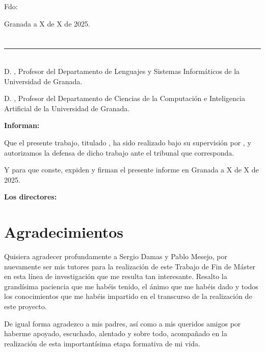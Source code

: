 \vspace{6cm}

\noindent Fdo: \myName

\vspace{2cm}

\begin{flushright}
Granada a X de X de 2025.
\end{flushright}


\chapter*{}
\thispagestyle{empty}

\noindent\rule[-1ex]{\textwidth}{2pt}\\[4.5ex]

D. \textbf{\myProf}, Profesor del Departamento de Lenguajes y Sistemas Informáticos de la Universidad de Granada.

\vspace{0.25cm}

D. \textbf{\myOtherProf}, Profesor del Departamento de Ciencias de la Computación e Inteligencia Artificial de la Universidad de Granada.


\vspace{0.25cm}

\textbf{Informan:}

\vspace{0.25cm}

Que el presente trabajo, titulado \textit{\textbf{\myTitle}},
ha sido realizado bajo su supervisión por \textbf{\myName}, y autorizamos la defensa de dicho trabajo ante el tribunal
que corresponda.

\vspace{0.5cm}

Y para que conste, expiden y firman el presente informe en Granada a X de X de 2025.

\vspace{0.5cm}

\textbf{Los directores:}

\vspace{5cm}

\noindent \textbf{\myProf \hfill
\myOtherProf}

\chapter*{Agradecimientos}
\thispagestyle{empty}

\vspace{1cm}

Quisiera agradecer profundamente a Sergio Damas y Pablo Mesejo, por nuevamente ser mis tutores para la realización de este Trabajo de Fin de Máster en esta línea de investigación que me resulta tan interesante. Resalto la grandísima paciencia que me habéis tenido, el ánimo que me habéis dado y todos los conocimientos que me habéis impartido en el transcurso de la realización de este proyecto.

De igual forma agradezco a mis padres, así como a mis queridos amigos por haberme apoyado, escuchado, alentado y sobre todo, acompañado en la realización de esta importantísima etapa formativa de mi vida.